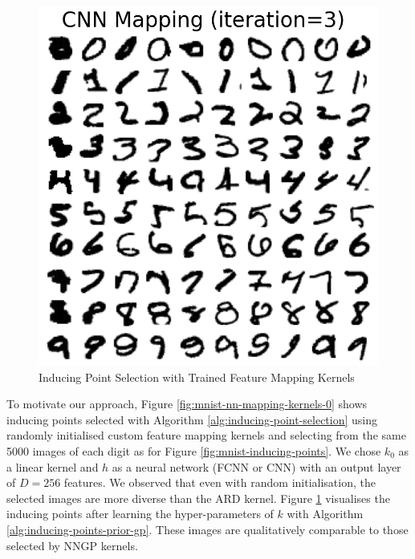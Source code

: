 \documentclass{article}
\numberwithin{equation}{section}
\begin{document}
\begin{figure}[h!]
\begin{minipage}{.25\textwidth}
  \includegraphics[width=\linewidth, trim={0 0 0 1.5cm},clip]{thesis_report/figures/custom_mapping/cnn/iteration_3.png}
\end{minipage}%
\caption{Inducing Point Selection with Trained Feature Mapping Kernels}\label{fig:mnist-nn-mapping-kernels-3}
\end{figure}

To motivate our approach, Figure \ref{fig:mnist-nn-mapping-kernels-0} shows inducing points selected with Algorithm \ref{alg:inducing-point-selection} using randomly initialised custom feature mapping kernels and selecting from the same 5000 images of each digit as for Figure \ref{fig:mnist-inducing-points}. 
We chose $k_0$ as a linear kernel and $h$ as a neural network (FCNN or CNN) with an output layer of $D=256$ features. 
We observed that even with random initialisation, the selected images are more diverse than the ARD kernel.
Figure \ref{fig:mnist-nn-mapping-kernels-3} visualises the inducing points after learning the hyper-parameters of $k$ with Algorithm \ref{alg:inducing-points-prior-gp}.
These images are qualitatively comparable to those selected by NNGP kernels.
\end{document}
